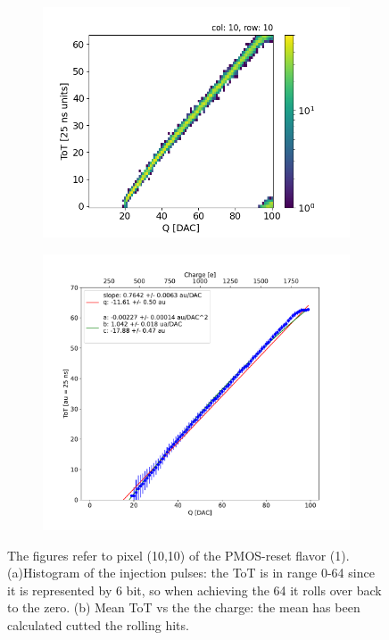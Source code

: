         \begin{figure}[h!]
            \begin{subfigure}{.5\textwidth}
            \centering
            \includegraphics[width=.98\linewidth]{figures/charaterization/ToT_rollover.png}            
            \end{subfigure}
            \begin{subfigure}{.5\textwidth}
            \centering
            \includegraphics[width=.98\linewidth]{figures/charaterization/ToT_injection.pdf}
            \end{subfigure}
            \label{fig:ToT_vs_charge}
            \caption{The figures refer to pixel (10,10) of the PMOS-reset flavor (1). (a)Histogram of the injection pulses: the ToT is in range 0-64 since it is represented by 6 bit, so when achieving the 64 it rolls over back to the zero. (b) Mean ToT vs the the charge: the mean has been calculated cutted the rolling hits. }
        \end{figure}    

